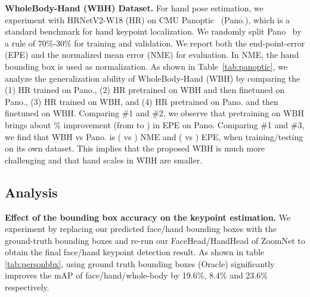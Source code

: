 \documentclass[runningheads]{llncs}
\begin{document}
	\textbf{WholeBody-Hand (WBH) Dataset.}
	For hand pose estimation, we experiment with HRNetV2-W18 (HR) on CMU Panoptic~\cite{simon2017hand} (Pano.), which is a standard benchmark for hand keypoint localization. We randomly split Pano~\cite{simon2017hand} by a rule of 70\%-30\% for training and validation. We report both the end-point-error (EPE) and the normalized mean error (NME) for evaluation. In NME, the hand bounding box is used as normalization. As shown in Table~\ref{tab:panoptic}, we analyze the generalization ability of WholeBody-Hand (WBH) by comparing the (1) HR trained on Pano., (2) HR pretrained on WBH and then finetuned on Pano., (3) HR trained on WBH, and (4) HR pretrained on Pano. and then finetuned on WBH. Comparing \#1 and \#2, we observe that pretraining on WBH brings about \% improvement (from  to ) in EPE on Pano. Comparing \#1 and \#3, we find that WBH vs Pano. is ( vs ) NME and ( vs ) EPE, when training/testing on its own dataset. This implies that the proposed WBH is much more challenging and that hand scales in WBH are smaller.
	
	\subsection{Analysis}
	\textbf{Effect of the bounding box accuracy on the keypoint estimation.} We experiment by replacing our predicted face/hand bounding boxes with the ground-truth bounding boxes and re-run our FaceHead/HandHead of ZoomNet to obtain the final face/hand keypoint detection result. As shown in table \ref{tab:personbbx}, using ground truth bounding boxes (Oracle) significantly improves the mAP of face/hand/whole-body by 19.6\%, 8.4\% and 23.6\% respectively. 
	
\end{document}
